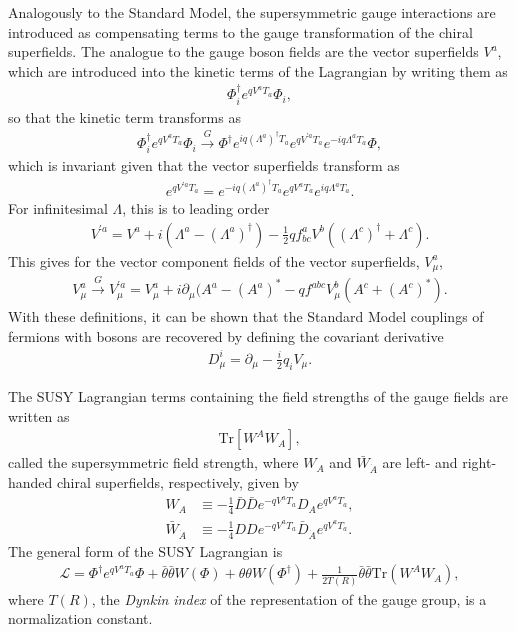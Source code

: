 \documentclass[twoside,english]{uiofysmaster}
\begin{document}
Analogously to the Standard Model, the supersymmetric gauge interactions are introduced as compensating terms to the gauge transformation of the chiral superfields. The analogue to the gauge boson fields are the vector superfields $V^a$, which are introduced into the kinetic terms of the Lagrangian by writing them as
\begin{align}
	\Phi^\dag_i e^{q V^a T_a}\Phi_i,
\end{align}
so that the kinetic term transforms as
\begin{align}
	\Phi_i^\dag e^{q V^a T_a}\Phi_i \overset{G}{\to} \Phi^\dag e^{iq(\Lambda^a)^\dag T_a}e^{qV^{'a}T_a}e^{-iq\Lambda^a T_a}\Phi,
\end{align}
which is invariant given that the vector superfields transform as
\begin{align}
	e^{qV^{'a} T_a} = e^{-iq(\Lambda^a)^\dag T_a}e^{qV^a T_a}e^{iq\Lambda^a T_a}.
\end{align}
For infinitesimal $\Lambda$, this is to leading order
\begin{align}
	V^{'a} = V^a + i(\Lambda^a - (\Lambda^a)^\dag) - \frac{1}{2}qf^a_{bc} V^b ((\Lambda^c)^\dag + \Lambda^c).
\end{align}
This gives for the vector component fields of the vector superfields, $V_\mu^a$,
\begin{align}
	V^a_\mu \overset{G}{\to} V^{'a}_\mu = V_\mu^a + i\partial_\mu(A^a - (A^a)^* - qf^{abc} V_\mu^b (A^c + (A^{c})^*).
\end{align}
With these definitions, it can be shown that the Standard Model couplings of fermions with bosons are recovered by defining the covariant derivative
\begin{align}
	D_\mu^i = \partial_\mu - \frac{i}{2} q_i V_\mu.
\end{align}

The SUSY Lagrangian terms containing the field strengths of the gauge fields are written as
\begin{align}
	\mathrm{Tr}[W^A W_A],
\end{align}
called the supersymmetric field strength, where $W_A$ and $\bar W_{\dot A}$ are left- and right-handed chiral superfields, respectively, given by
\begin{align}
	W_A &\equiv -\frac{1}{4}\bar D\bar D e^{-qV^aT_a} D_A e^{qV^a T_a},\\
	\bar W_{\dot A} &\equiv -\frac{1}{4} D D e^{-qV^aT_a} \bar D_{\dot A} e^{qV^a T_a}.
\end{align}
The general form of the SUSY Lagrangian is
\begin{align}
	\mathcal{L} = \Phi^\dag e^{qV^a T_a}\Phi + \bar\theta\bar\theta W(\Phi) + \theta\theta W(\Phi^\dag) + \frac{1}{2T(R)}\bar\theta\bar\theta \mathrm{Tr}(W^A W_A),
\end{align}
where $T(R)$, the {\it Dynkin index} of the representation of the gauge group, is a normalization constant.
\end{document}
